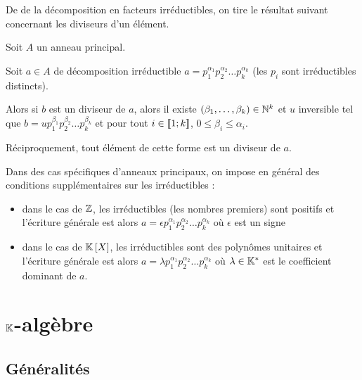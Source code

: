 De  de la décomposition en facteurs irréductibles, on tire le résultat suivant concernant les diviseurs d'un élément.

\begin{prop}
Soit \(A\) un anneau principal.

Soit \(a\in A\) de décomposition irréductible \(a=p_1^{\alpha_1}p_2^{\alpha_2}\dots p_k^{\alpha_k}\) (les \(p_i\) sont irréductibles distincts).

Alors si \(b\) est un diviseur de \(a\), alors il existe \(\left(\beta_1,\dots,\beta_k\right)\in\mathbb{N}^k\) et \(u\) inversible tel que \(b=up_1^{\beta_1}p_2^{\beta_2}\dots p_k^{\beta_k}\) et pour tout \(i\in\left\llbracket1;k\right\rrbracket\), \(0\leq\beta_i\leq\alpha_i\).

Réciproquement, tout élément de cette forme est un diviseur de \(a\).
\end{prop}

\begin{rem}
Dans des cas spécifiques d'anneaux principaux, on impose en général des conditions supplémentaires sur les irréductibles :

\begin{itemize}
    \item dans le cas de \(\mathbb{Z}\), les irréductibles (\ie les nombres premiers) sont positifs et l'écriture générale est alors \(a=\epsilon p_1^{\alpha_1}p_2^{\alpha_2}\dots p_k^{\alpha_k}\) où \(\epsilon\) est un signe \\
    \item dans le cas de \(\poly\), les irréductibles sont des polynômes unitaires et l'écriture générale est alors \(a=\lambda p_1^{\alpha_1}p_2^{\alpha_2}\dots p_k^{\alpha_k}\) où \(\lambda\in\mathbb{K}^*\) est le coefficient dominant de \(a\).
\end{itemize}
\end{rem}

\section{\(\mathbb{K}\)-algèbre}

\subsection{Généralités}

